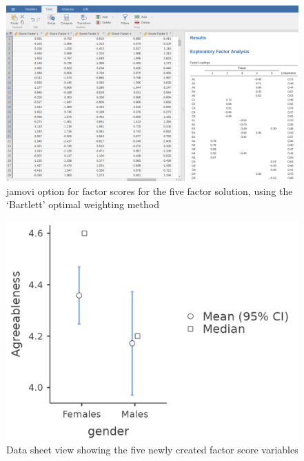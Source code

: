 \documentclass[
  a4paper,
]{book}
\begin{document}
\begin{figure}

\includegraphics[width=1\textwidth,height=\textheight]{images/fig15-10.png} \hfill{}

\caption{\label{fig-fig15-10}jamovi option for factor scores for the
five factor solution, using the `Bartlett' optimal weighting method}

\end{figure}

\begin{figure}

\includegraphics[width=1\textwidth,height=\textheight]{images/fig15-11.png} \hfill{}

\caption{\label{fig-fig15-11}Data sheet view showing the five newly
created factor score variables}

\end{figure}
\end{document}
